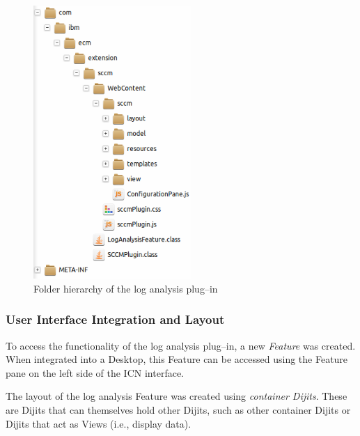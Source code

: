 \begin{figure}
	\centering
	\includegraphics[width=6cm]{screens/folders.png}
	\caption{Folder hierarchy of the log analysis plug--in}
	\label{fig:folders}
\end{figure}

\subsubsection*{User Interface Integration and Layout}
To access the functionality of the log analysis plug--in, a new \emph{Feature} was created. When integrated into a Desktop, this Feature can be accessed using the Feature pane on the left side of the ICN interface.

The layout of the log analysis Feature was created using \emph{container Dijits}. These are Dijits that can themselves hold other Dijits, such as other container Dijits or Dijits that act as Views (i.e., display data).

